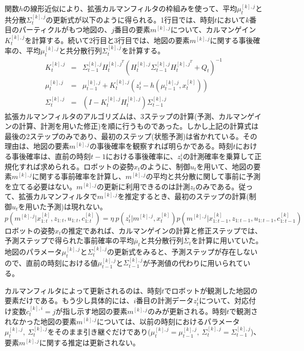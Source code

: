 \documentclass[dvipdfmx,a4paper]{jsarticle}
\begin{document}
関数$h$の線形近似により、拡張カルマンフィルタの枠組みを使って、平均$\mu_t^{[k], j}$と共分散$\Sigma_t^{[k], j}$の更新式が以下のように得られる。1行目では、時刻$t$において$k$番目のパーティクルがもつ地図の、$j$番目の要素$m^{[k], j}$について、カルマンゲイン$K_t^{[k], j}$を計算する。続いて2行目と3行目では、地図の要素$m^{[k], j}$に関する事後確率の、平均$\mu_t^{[k], j}$と共分散行列$\Sigma_t^{[k], j}$を計算する。
\begin{eqnarray}
	K_t^{[k], j} &=& \Sigma_{t - 1}^{[k], j} H_t^{{[k], j}^T} \left( H_t^{[k], j} \Sigma_{t - 1}^{[k], j} H_t^{{[k], j}^T} + Q_t \right)^{-1} \\
	\mu_t^{[k], j} &=& \mu_{t - 1}^{[k], j} + K_t^{[k], j} \left( z_t^i - h(\mu_{t - 1}^{[k], j}, x_t^{[k]}) \right) \\
	\Sigma_t^{[k], j} &=& \left( I - K_t^{[k], j} H_t^{[k], j} \right) \Sigma_{t - 1}^{[k], j}
\end{eqnarray}
拡張カルマンフィルタのアルゴリズムは、3ステップの計算(予測、カルマンゲインの計算、計測を用いた修正)を順に行うものであった。しかし上記の計算式は最後の2ステップのみであり、最初のステップ(状態予測)は省かれている。その理由は、地図の要素$m^{[k], j}$の事後確率を観察すれば明らかである。時刻$t$における事後確率は、直前の時刻$t - 1$における事後確率に、$z_t^i$の計測確率を乗算して正規化すれば求められる。ロボットの姿勢$x_t$のように、制御$u_t$を用いて、地図の要素$m^{[k], j}$に関する事前確率を計算し、$m^{[k], j}$の平均と共分散に関して事前に予測を立てる必要はない。$m^{[k], j}$の更新に利用できるのは計測$z_t$のみである。従って、拡張カルマンフィルタで$m^{[k], j}$を推定するとき、最初のステップの計算(制御$u_t$を用いた予測)は現れない。
\begin{equation}
	p(m^{[k], j} | x_{1 : t}^{[k]}, z_{1 : t}, u_{1 : t}, c_{1 : t}^{[k]}) = \eta \ p(z_t^i | m^{[k], j}, x_t^{[k]}) p(m^{[k], j} | x_{1 : t - 1}^{[k]}, z_{1 : t - 1}, u_{1 : t - 1}, c_{1 : t - 1}^{[k]}) \nonumber
\end{equation}
ロボットの姿勢$x_t$の推定であれば、カルマンゲインの計算と修正ステップでは、予測ステップで得られた事前確率の平均$\overline{\mu}_t$と共分散行列$\overline{\Sigma}_t$を計算に用いていた。地図のパラメータ$\mu_t^{[k], j}$と$\Sigma_t^{[k], j}$の更新式をみると、予測ステップが存在しないので、直前の時刻における値$\mu_{t - 1}^{[k], j}$と$\Sigma_{t - 1}^{[k], j}$が予測値の代わりに用いられている。\newline

カルマンフィルタによって更新されるのは、時刻$t$でロボットが観測した地図の要素だけである。もう少し具体的には、$i$番目の計測データ$z_t^i$について、対応付け変数$c_t^{[k], i} = j$が指し示す地図の要素$m^{[k], j}$のみが更新される。時刻$t$で観測されなかった地図の要素$m^{[k], j}$については、以前の時刻におけるパラメータ$\mu_t^{[k], j}, \ \Sigma_t^{[k], j}$をそのまま引き継ぐだけであり($\mu_t^{[k], j} = \mu_{t - 1}^{[k], j}, \ \Sigma_t^{[k], j} = \Sigma_{t - 1}^{[k], j}$)、要素$m^{[k], j}$に関する推定は更新されない。\newline
\end{document}

